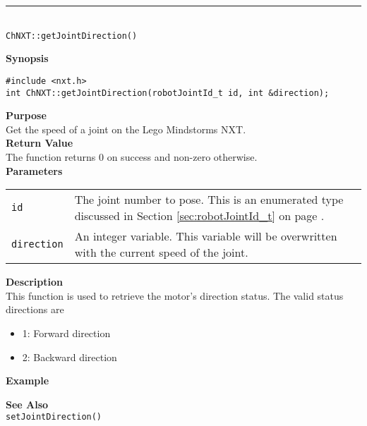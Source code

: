 \noindent
\vspace{5pt}
\rule{4.5in}{0.015in}\\
\noindent
{\LARGE \texttt{ChNXT::getJointDirection()}}\\
{}

\noindent
{\bf Synopsis}
\begin{lstlisting}
#include <nxt.h>
int ChNXT::getJointDirection(robotJointId_t id, int &direction);
\end{lstlisting}

\noindent
{\bf Purpose}\\
Get the speed of a joint on the Lego Mindstorms NXT.\\

\noindent
{\bf Return Value}\\
The function returns 0 on success and non-zero otherwise.\\

\noindent
{\bf Parameters}
\vspace{-0.1in}
\begin{description}
\item               
\begin{tabular}{p{10 mm}p{145 mm}}
\texttt{id} & The joint number to pose. This is an enumerated type 
discussed in Section \ref{sec:robotJointId_t} on page
\pageref{sec:robotJointId_t}.\\
\texttt{direction} & An integer variable. This variable will be overwritten
with the current speed of the joint.
\end{tabular}
\end{description}

\noindent
{\bf Description}\\
This function is used to retrieve the motor's direction status. The valid
status directions are
\begin{itemize}
\item 1: Forward direction
\item 2: Backward direction
\end{itemize}

\noindent
{\bf Example}
\noindent

\noindent
{\bf See Also}\\
\texttt{setJointDirection()}

